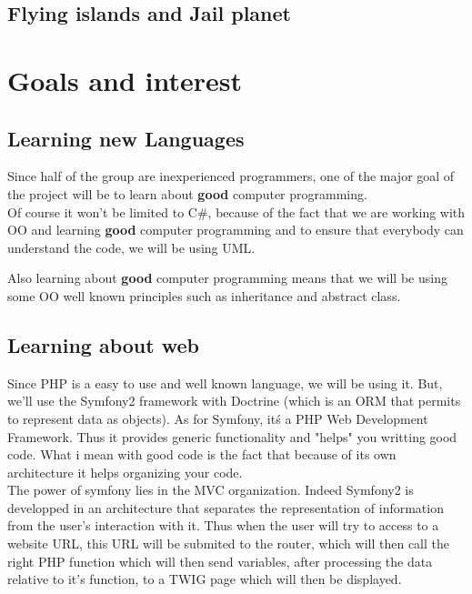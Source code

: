 \documentclass[article]{report} %
\begin{document}
						\section{Flying islands and Jail planet}
				\chapter{Goals and interest}
						\section{Learning new Languages}
								Since half of the group are inexperienced programmers, one of the major goal of the project will be to learn about \textbf{good} computer programming.\\
								
								Of course it won't be limited to C\#, because of the fact that we are working with OO and learning \textbf{good} computer programming and to ensure that everybody can understand the code, we will be using UML.\newline
																							
								Also learning about \textbf{good} computer programming means that we will be using some OO well known principles such as inheritance and abstract class.
							  
						\section{Learning about web}
							  		Since PHP is a easy to use and well known language, we will be using it. But, we'll use the Symfony2 framework with Doctrine (which is an ORM that permits to represent data as objects).\newline 
							  		As for Symfony, it\'s a PHP Web Development Framework. Thus it provides generic functionality and "helps" you writting good code. What i mean with good code is the fact that because of its own architecture it helps organizing your code.\\
							  		
							  		The power of symfony lies in the MVC organization. Indeed Symfony2 is developped in an architecture that separates the representation of information from the user's interaction with it.\newline
							  		 Thus when the user will try to access to a website URL, this URL will be submited to the router, which will then call the right PHP function which will then send variables, after processing the data relative to it's function, to a TWIG page which will then be displayed.
							  		 
\end{document}
